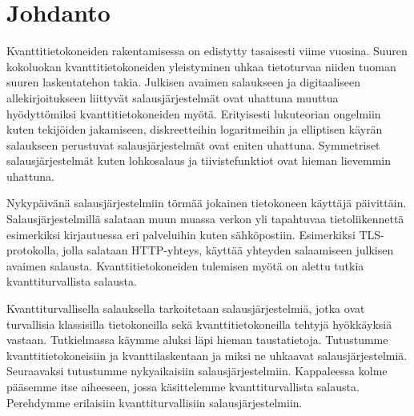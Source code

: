 \chapter{Johdanto\label{intro}}
Kvanttitietokoneiden rakentamisessa on edistytty tasaisesti viime vuosina. Suuren kokoluokan kvanttitietokoneiden yleistyminen uhkaa tietoturvaa niiden tuoman suuren laskentatehon takia. Julkisen avaimen salaukseen ja digitaaliseen allekirjoitukseen liittyvät salausjärjestelmät ovat uhattuna muuttua hyödyttömiksi kvanttitietokoneiden myötä. Erityisesti lukuteorian ongelmiin kuten tekijöiden jakamiseen, diskreetteihin logaritmeihin ja elliptisen käyrän salaukseen perustuvat salausjärjestelmät ovat eniten uhattuna. Symmetriset salausjärjestelmät kuten lohkosalaus ja tiivistefunktiot ovat hieman lievemmin uhattuna.

Nykypäivänä salausjärjestelmiin törmää jokainen tietokoneen käyttäjä päivittäin. Salausjärjestelmillä salataan muun muassa verkon yli tapahtuvaa tietoliikennettä esimerkiksi kirjautuessa eri palveluihin kuten sähköpostiin. Esimerkiksi TLS-protokolla, jolla salataan HTTP-yhteys, käyttää yhteyden salaamiseen julkisen avaimen salausta. Kvanttitietokoneiden tulemisen myötä on alettu tutkia kvanttiturvallista salausta.

Kvanttiturvallisella salauksella tarkoitetaan salausjärjestelmiä, jotka ovat turvallisia klassisilla tietokoneilla sekä kvanttitietokoneilla tehtyjä hyökkäyksiä vastaan. Tutkielmassa käymme aluksi läpi hieman taustatietoja. Tutustumme kvanttitietokoneisiin ja kvanttilaskentaan ja miksi ne uhkaavat salausjärjestelmiä. Seuraavaksi tutustumme nykyaikaisiin salausjärjestelmiin. Kappaleessa kolme pääsemme itse aiheeseen, jossa käsittelemme kvanttiturvallista salausta. Perehdymme erilaisiin kvanttiturvallisiin salausjärjestelmiin.